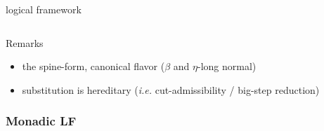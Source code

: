 \documentclass[ignorenonframetext,red]{beamer}
\begin{document}
\begin{frame}{ logical framework }
\begin{onlyenv}
$${        }
        $$
    \begin{block}{Remarks}
      \begin{itemize}
      \item the {spine-form}, \alert{canonical} flavor ($\beta$ and
        $\eta$-long normal)
      \item substitution is \alert{hereditary} (\emph{i.e.}
        cut-admissibility / big-step reduction)
      \end{itemize}
    \end{block}
  \end{onlyenv}
\end{frame}

\subsubsection{Monadic LF}
\end{document}
